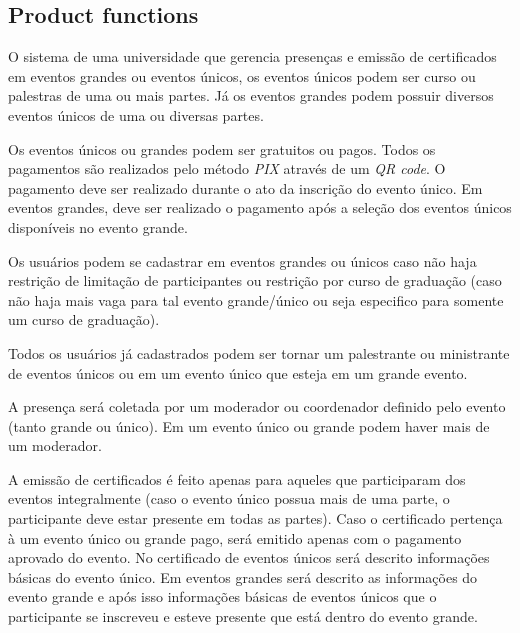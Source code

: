 \subsection{Product functions}
O sistema de uma universidade que gerencia presenças e emissão de certificados em eventos grandes ou eventos únicos, os eventos únicos podem ser curso ou palestras de uma ou mais partes. Já os eventos grandes podem possuir diversos eventos únicos de uma ou diversas partes.

Os eventos únicos ou grandes podem ser gratuitos ou pagos. Todos os pagamentos são realizados pelo método \textit{PIX} através de um \textit{QR code}. O pagamento deve ser realizado durante o ato da inscrição do evento único. Em eventos grandes, deve ser realizado o pagamento após a seleção dos eventos únicos disponíveis no evento grande.

Os usuários podem se cadastrar em eventos grandes ou únicos caso não haja restrição de limitação de participantes ou restrição por curso de graduação (caso não haja mais vaga para tal evento grande/único ou seja especifico para somente um curso de graduação).

Todos os usuários já cadastrados podem ser tornar um palestrante ou ministrante de eventos únicos ou em um evento único que esteja em um grande evento.

A presença será coletada por um moderador ou coordenador definido pelo evento (tanto grande ou único). Em um evento único ou grande podem haver mais de um moderador.

A emissão de certificados é feito apenas para aqueles que participaram dos eventos integralmente (caso o evento único possua mais de uma parte, o participante deve estar presente em todas as partes). Caso o certificado pertença à um evento único ou grande pago, será emitido apenas com o pagamento aprovado do evento. No certificado de eventos únicos será descrito informações básicas do evento único. Em eventos grandes será descrito as informações do evento grande e após isso informações básicas de eventos únicos que o participante se inscreveu e esteve presente que está dentro do evento grande. 
